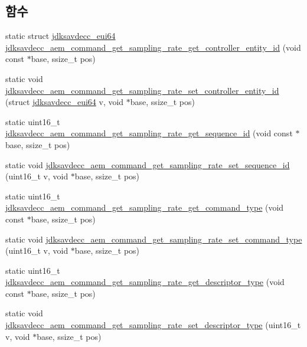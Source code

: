 \subsection*{함수}
\begin{DoxyCompactItemize}
\item 
static struct \hyperlink{structjdksavdecc__eui64}{jdksavdecc\+\_\+eui64} \hyperlink{group__command__get__sampling__rate_ga5028018668b2880bd4ce272e63ed3672}{jdksavdecc\+\_\+aem\+\_\+command\+\_\+get\+\_\+sampling\+\_\+rate\+\_\+get\+\_\+controller\+\_\+entity\+\_\+id} (void const $\ast$base, ssize\+\_\+t pos)
\item 
static void \hyperlink{group__command__get__sampling__rate_ga68e90b5656fd2a6f3c663c96e486d29d}{jdksavdecc\+\_\+aem\+\_\+command\+\_\+get\+\_\+sampling\+\_\+rate\+\_\+set\+\_\+controller\+\_\+entity\+\_\+id} (struct \hyperlink{structjdksavdecc__eui64}{jdksavdecc\+\_\+eui64} v, void $\ast$base, ssize\+\_\+t pos)
\item 
static uint16\+\_\+t \hyperlink{group__command__get__sampling__rate_gaca2fd2a5bc2c89dcf27f20899704facb}{jdksavdecc\+\_\+aem\+\_\+command\+\_\+get\+\_\+sampling\+\_\+rate\+\_\+get\+\_\+sequence\+\_\+id} (void const $\ast$base, ssize\+\_\+t pos)
\item 
static void \hyperlink{group__command__get__sampling__rate_gabc2d68ec232f74bb0a6b22168acacc5f}{jdksavdecc\+\_\+aem\+\_\+command\+\_\+get\+\_\+sampling\+\_\+rate\+\_\+set\+\_\+sequence\+\_\+id} (uint16\+\_\+t v, void $\ast$base, ssize\+\_\+t pos)
\item 
static uint16\+\_\+t \hyperlink{group__command__get__sampling__rate_gaa53271f306c68e49b0f4c26f0ba58791}{jdksavdecc\+\_\+aem\+\_\+command\+\_\+get\+\_\+sampling\+\_\+rate\+\_\+get\+\_\+command\+\_\+type} (void const $\ast$base, ssize\+\_\+t pos)
\item 
static void \hyperlink{group__command__get__sampling__rate_ga0f16a803308dccbe806bc1e60ca69f4d}{jdksavdecc\+\_\+aem\+\_\+command\+\_\+get\+\_\+sampling\+\_\+rate\+\_\+set\+\_\+command\+\_\+type} (uint16\+\_\+t v, void $\ast$base, ssize\+\_\+t pos)
\item 
static uint16\+\_\+t \hyperlink{group__command__get__sampling__rate_ga12b0afdabc1bcd10a5ad67f241fb8de9}{jdksavdecc\+\_\+aem\+\_\+command\+\_\+get\+\_\+sampling\+\_\+rate\+\_\+get\+\_\+descriptor\+\_\+type} (void const $\ast$base, ssize\+\_\+t pos)
\item 
static void \hyperlink{group__command__get__sampling__rate_ga347f9dd47644afa06af13c234ff2397e}{jdksavdecc\+\_\+aem\+\_\+command\+\_\+get\+\_\+sampling\+\_\+rate\+\_\+set\+\_\+descriptor\+\_\+type} (uint16\+\_\+t v, void $\ast$base, ssize\+\_\+t pos)

\end{DoxyCompactItemize}
